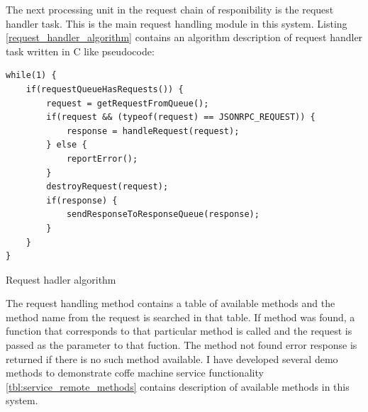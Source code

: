 The next processing unit in the request chain of responibility is the request handler task.
This is the main request handling module in this system.
Listing \ref{request_handler_algorithm} contains an algorithm description of request handler task written in C like pseudocode: 

\begin{listing}[h]
\begin{verbatim}
while(1) {
	if(requestQueueHasRequests()) {
		request = getRequestFromQueue();
		if(request && (typeof(request) == JSONRPC_REQUEST)) {
			response = handleRequest(request);			
		} else {
			reportError();
		}
		destroyRequest(request);
		if(response) {
			sendResponseToResponseQueue(response);
		}		
	}
}
\end{verbatim}
\caption{Request hadler algorithm}
\label{lst:request_handler_algorithm}
\end{listing}

The request handling method contains a table of available methods and the method name from the request is searched in that table.
If method was found, a function that corresponds to that particular method is called and the request is passed as the parameter to that fuction.
The method not found error response is returned if there is no such method available.
I have developed several demo methods to demonstrate coffe machine service functionality
\autoref{tbl:service_remote_methods} contains description of available methods in this system.

